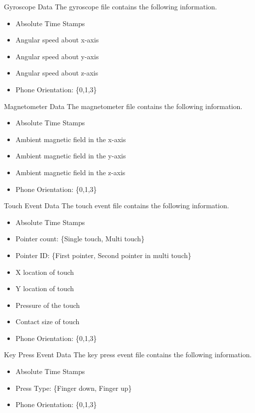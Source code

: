 \documentclass[10pt]{beamer}
\begin{document}
\begin{frame} {Gyroscope Data}
The gyroscope file contains the following information.
\begin{itemize}
\item Absolute Time Stamps
\item Angular speed about x-axis
\item Angular speed about y-axis
\item Angular speed about z-axis
\item Phone Orientation: \{0,1,3\}
\end{itemize}
\end{frame}

\begin{frame} {Magnetometer Data}
The magnetometer file contains the following information.
\begin{itemize}
\item Absolute Time Stamps
\item Ambient magnetic field in the x-axis
\item Ambient magnetic field in the y-axis
\item Ambient magnetic field in the z-axis
\item Phone Orientation: \{0,1,3\}
\end{itemize}
\end{frame}

\begin{frame} {Touch Event Data}
The touch event file contains the following information.
\begin{itemize}
\item Absolute Time Stamps
\item Pointer count: \{Single touch, Multi touch\}
\item Pointer ID: \{First pointer, Second pointer in multi touch\}
\item X location of touch
\item Y location of touch
\item Pressure of the touch 
\item Contact size of touch
\item Phone Orientation: \{0,1,3\}
\end{itemize}
\end{frame}

\begin{frame} {Key Press Event Data}
The key press event file contains the following information.
\begin{itemize}
\item Absolute Time Stamps
\item Press Type: \{Finger down, Finger up\}
\item Phone Orientation: \{0,1,3\}
\end{itemize}
\end{frame}
\end{document}

